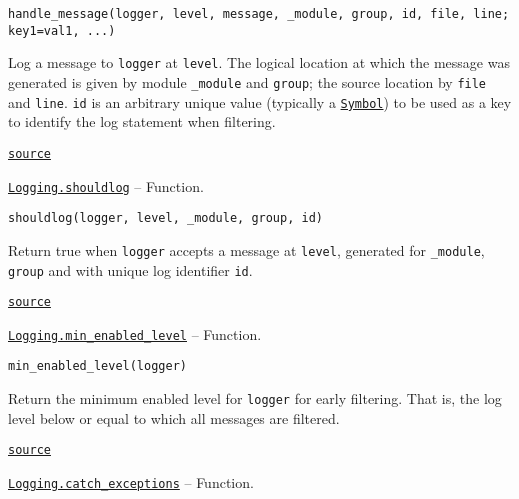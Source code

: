 \begin{adjustwidth}{2em}{0pt}


\begin{verbatim}
handle_message(logger, level, message, _module, group, id, file, line; key1=val1, ...)
\end{verbatim}

Log a message to \texttt{logger} at \texttt{level}.  The logical location at which the message was generated is given by module \texttt{\_module} and \texttt{group}; the source location by \texttt{file} and \texttt{line}. \texttt{id} is an arbitrary unique value (typically a \hyperlink{18332791376992528422}{\texttt{Symbol}}) to be used as a key to identify the log statement when filtering.



\href{https://github.com/JuliaLang/julia/blob/44fa15b1502a45eac76c9017af94332d4557b251/base/logging.jl#L31-L39}{\texttt{source}}


\end{adjustwidth}
\hypertarget{10642364941499317938}{} 
\hyperlink{10642364941499317938}{\texttt{Logging.shouldlog}}  -- {Function.}

\begin{adjustwidth}{2em}{0pt}


\begin{verbatim}
shouldlog(logger, level, _module, group, id)
\end{verbatim}

Return true when \texttt{logger} accepts a message at \texttt{level}, generated for \texttt{\_module}, \texttt{group} and with unique log identifier \texttt{id}.



\href{https://github.com/JuliaLang/julia/blob/44fa15b1502a45eac76c9017af94332d4557b251/base/logging.jl#L42-L47}{\texttt{source}}


\end{adjustwidth}
\hypertarget{1177702033979282781}{} 
\hyperlink{1177702033979282781}{\texttt{Logging.min\_enabled\_level}}  -- {Function.}

\begin{adjustwidth}{2em}{0pt}


\begin{verbatim}
min_enabled_level(logger)
\end{verbatim}

Return the minimum enabled level for \texttt{logger} for early filtering.  That is, the log level below or equal to which all messages are filtered.



\href{https://github.com/JuliaLang/julia/blob/44fa15b1502a45eac76c9017af94332d4557b251/base/logging.jl#L50-L55}{\texttt{source}}


\end{adjustwidth}
\hypertarget{13546483368377724892}{} 
\hyperlink{13546483368377724892}{\texttt{Logging.catch\_exceptions}}  -- {Function.}

